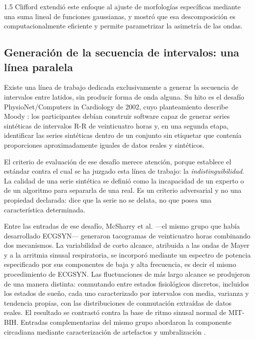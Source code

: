 \begin{spacing}{1.5}
Clifford \cite{clifford2004model} extendió este enfoque al ajuste de morfologías específicas mediante una suma lineal de funciones gaussianas, y mostró que esa descomposición es computacionalmente eficiente y permite parametrizar la asimetría de las ondas.

\subsection{Generación de la secuencia de intervalos: una línea paralela}

Existe una línea de trabajo dedicada exclusivamente a generar la secuencia de intervalos entre latidos, sin producir forma de onda alguna. Su hito es el desafío PhysioNet/Computers in Cardiology de 2002, cuyo planteamiento describe Moody \cite{moody2002challenge}: los participantes debían construir software capaz de generar series sintéticas de intervalos R-R de veinticuatro horas y, en una segunda etapa, identificar las series sintéticas dentro de un conjunto sin etiquetar que contenía proporciones aproximadamente iguales de datos reales y sintéticos.

El criterio de evaluación de ese desafío merece atención, porque establece el estándar contra el cual se ha juzgado esta línea de trabajo: la \emph{indistinguibilidad}. La calidad de una serie sintética se definió como la incapacidad de un experto o de un algoritmo para separarla de una real. Es un criterio adversarial y no una propiedad declarada: dice que la serie no se delata, no que posea una característica determinada.

Entre las entradas de ese desafío, McSharry et al. \cite{mcsharry2002tachogram} ---el mismo grupo que había desarrollado ECGSYN--- generaron tacogramas de veinticuatro horas combinando dos mecanismos. La variabilidad de corto alcance, atribuida a las ondas de Mayer y a la arritmia sinusal respiratoria, se incorporó mediante un espectro de potencia especificado por sus componentes de baja y alta frecuencia, es decir el mismo procedimiento de ECGSYN. Las fluctuaciones de más largo alcance se produjeron de una manera distinta: conmutando entre estados fisiológicos discretos, incluidos los estados de sueño, cada uno caracterizado por intervalos con media, varianza y tendencia propias, con las distribuciones de conmutación extraídas de datos reales. El resultado se contrastó contra la base de ritmo sinusal normal de MIT-BIH. Entradas complementarias del mismo grupo abordaron la componente circadiana mediante caracterización de artefactos y umbralización \cite{clifford2002artefact}.


\end{spacing}
